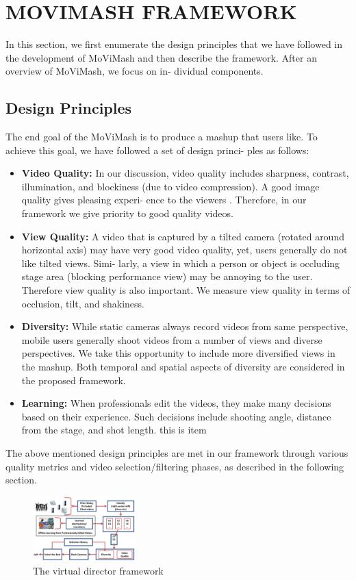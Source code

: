 \documentclass{sig-alternate}
\begin{document}
\section{MOVIMASH FRAMEWORK}
In this section, we first enumerate the design principles that we
have followed in the development of MoViMash and then describe
the framework. After an overview of MoViMash, we focus on in-
dividual components.
\subsection{Design Principles}
The end goal of the MoViMash is to produce a mashup that users
like. To achieve this goal, we have followed a set of design princi-
ples as follows:
\begin{itemize}
\item \textbf{Video Quality:} In our discussion, video quality includes
sharpness, contrast, illumination, and blockiness (due to video
compression). A good image quality gives pleasing experi-
ence to the viewers \cite{10}. Therefore, in our framework we
give priority to good quality videos.
\item \textbf{View Quality:} A video that is captured by a tilted camera
(rotated around horizontal axis) may have very good video
quality, yet, users generally do not like tilted views. Simi-
larly, a view in which a person or object is occluding stage
area (blocking performance view) may be annoying to the user. Therefore view quality is also important. We measure
view quality in terms of occlusion, tilt, and shakiness.
\item \textbf{Diversity:} While static cameras always record videos from
same perspective, mobile users generally shoot videos from
a number of views and diverse perspectives. We take this
opportunity to include more diversified views in the mashup.
Both temporal and spatial aspects of diversity are considered
in the proposed framework.
\item \textbf{Learning:} When professionals edit the videos, they make
many decisions based on their experience. Such decisions
include shooting angle, distance from the stage, and shot
length. this is item
\end{itemize}
The above mentioned design principles are met in our framework
through various quality metrics and video selection/filtering phases,
as described in the following section.

\begin{figure}[htp]
\centering
\includegraphics[width=4cm]{images/img2.png}
\caption{The virtual director framework}
\end{figure}
\end{document}

